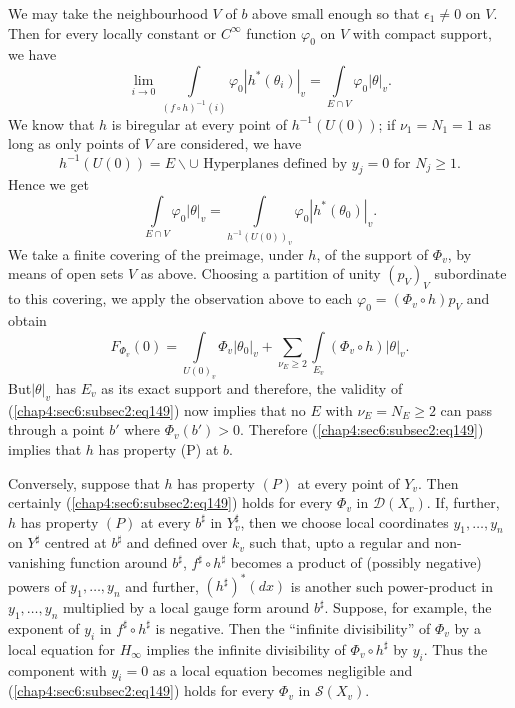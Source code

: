 We may take the neighbourhood $V$ of $b$ above small enough so that
$\epsilon_{1}\neq 0$ on $V$. Then for every locally constant or
$C^{\infty}$ function $\varphi_{0}$ on $V$ with compact support, we
have
$$
\lim\limits_{i\to 0}\int\limits_{(f\circ
  h)^{-1}(i)}\varphi_{0}|h^{\ast}(\theta_{i})|_{v}=\int\limits_{E\cap
  V}\varphi_{0}|\theta|_{v}. 
$$
We know that $h$ is biregular at every point of $h^{-1}(U(0))$; if
$\nu_{1}=N_{1}=1$ as long as only points of $V$ are considered, we
have
$$
h^{-1}(U(0))=E\backslash \cup \text{ Hyperplanes defined by } y_{j}=0
\text{ for } N_{j}\geq 1.
$$
Hence we get
$$
\int\limits_{E\cap
  V}\varphi_{0}|\theta|_{v}=\int\limits_{h^{-1}(U(0))_{v}}\varphi_{0}|h^{\ast}(\theta_{0})|_{v}. 
$$
We take a finite covering of the preimage, under $h$, of the support
of $\Phi_{v}$, by means of open sets $V$ as above. Choosing a
partition of unity $(p_{V})_{V}$ subordinate to this covering, we
apply the observation above to each $\varphi_{0}=(\Phi_{v}\circ
h)p_{V}$ and obtain 
$$
F_{\Phi_{v}}(0)=\int\limits_{U(0)_{v}}\Phi_{v}|\theta_{0}|_{v}+\sum_{\nu_{E}\geq
  2}\int\limits_{E_{v}}(\Phi_{v}\circ h)|\theta|_{v}.
$$
But\pageoriginale $|\theta|_{v}$ has $E_{v}$ as its exact support and
therefore, the validity of (\ref{chap4:sec6:subsec2:eq149}) now implies that no $E$ with
$\nu_{E}=N_{E}\geq 2$ can pass through a point $b'$ where
$\Phi_{v}(b')>0$. Therefore (\ref{chap4:sec6:subsec2:eq149}) implies
that $h$ has property (P) at $b$.

Conversely, suppose that $h$ has property $(P)$ at every point of
$Y_{v}$. Then certainly (\ref{chap4:sec6:subsec2:eq149}) holds for every $\Phi_{v}$ in
$\mathscr{D}(X_{v})$. If, further, $h$ has property $(P)$ at every
$b^{\sharp}$ in $Y^{\sharp}_{v}$, then we choose local coordinates
$y_{1},\ldots,y_{n}$ on $Y^{\sharp}$ centred at $b^{\sharp}$ and
defined over $k_{v}$ such that, upto a regular and non-vanishing
function around $b^{\sharp}$, $f^{\sharp}\circ h^{\sharp}$ becomes a
product of (possibly negative) powers of $y_{1},\ldots,y_{n}$ and
further, $(h^{\sharp})^{\ast}(dx)$ is another such power-product in
$y_{1},\ldots,y_{n}$ multiplied by a local gauge form around
$b^{\sharp}$. Suppose, for example, the exponent of $y_{i}$ in
$f^{\sharp}\circ h^{\sharp}$ is negative. Then the ``infinite
divisibility'' of $\Phi_{v}$ by a local equation for $H_{\infty}$
implies the infinite divisibility of $\Phi_{v}\circ h^{\sharp}$ by
$y_{i}$. Thus the component with $y_{i}=0$ as a local equation becomes
negligible and (\ref{chap4:sec6:subsec2:eq149}) holds for every
$\Phi_{v}$ in $\mathscr{S}(X_{v})$.

